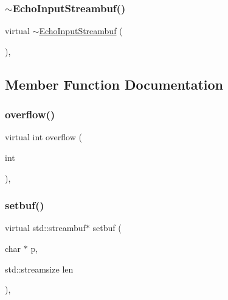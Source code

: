 \subsubsection{\texorpdfstring{$\sim$\+Echo\+Input\+Streambuf()}{~EchoInputStreambuf()}}
{\footnotesize\ttfamily virtual $\sim$\mbox{\hyperlink{classsgl_1_1EchoInputStreambuf}{Echo\+Input\+Streambuf}} (\begin{DoxyParamCaption}{ }\end{DoxyParamCaption})\hspace{0.3cm}{\ttfamily [inline]}, {\ttfamily [virtual]}}



\subsection{Member Function Documentation}
\mbox{\label{classsgl_1_1EchoInputStreambuf_a71cbc6b1ec560d3788dac4c02e9328da}} 
\subsubsection{\texorpdfstring{overflow()}{overflow()}}
{\footnotesize\ttfamily virtual int overflow (\begin{DoxyParamCaption}\item[{int}]{ }\end{DoxyParamCaption})\hspace{0.3cm}{\ttfamily [inline]}, {\ttfamily [virtual]}}

\mbox{\label{classsgl_1_1EchoInputStreambuf_adab87f356f20a3d6ac970facd081f967}} 
\subsubsection{\texorpdfstring{setbuf()}{setbuf()}}
{\footnotesize\ttfamily virtual std\+::streambuf$\ast$ setbuf (\begin{DoxyParamCaption}\item[{char $\ast$}]{p,  }\item[{std\+::streamsize}]{len }\end{DoxyParamCaption})\hspace{0.3cm}{\ttfamily [inline]}, {\ttfamily [virtual]}}

